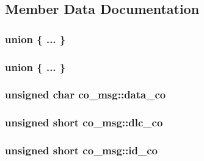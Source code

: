 \subsection{Member Data Documentation}
\subsubsection[{\texorpdfstring{"@2}{@2}}]{\setlength{\rightskip}{0pt plus 5cm}union \{ ... \} }\hypertarget{structco__msg_af8251e2eaf9e807267d3ced55e292142}{}\label{structco__msg_af8251e2eaf9e807267d3ced55e292142}
\subsubsection[{\texorpdfstring{"@4}{@4}}]{\setlength{\rightskip}{0pt plus 5cm}union \{ ... \} }\hypertarget{structco__msg_a549464c55b7bbab6345f082dab73b275}{}\label{structco__msg_a549464c55b7bbab6345f082dab73b275}
\subsubsection[{\texorpdfstring{data\+\_\+co}{data_co}}]{\setlength{\rightskip}{0pt plus 5cm}unsigned char co\+\_\+msg\+::data\+\_\+co}\hypertarget{structco__msg_a3ced1bf4d72ca82fe53c829d42cd946e}{}\label{structco__msg_a3ced1bf4d72ca82fe53c829d42cd946e}
\subsubsection[{\texorpdfstring{dlc\+\_\+co}{dlc_co}}]{\setlength{\rightskip}{0pt plus 5cm}unsigned short co\+\_\+msg\+::dlc\+\_\+co}\hypertarget{structco__msg_ab19d6996baf97d346427d9789d7e4a6b}{}\label{structco__msg_ab19d6996baf97d346427d9789d7e4a6b}
\subsubsection[{\texorpdfstring{id\+\_\+co}{id_co}}]{\setlength{\rightskip}{0pt plus 5cm}unsigned short co\+\_\+msg\+::id\+\_\+co}\hypertarget{structco__msg_a634de83979d7da90565eccdf16304a07}{}\label{structco__msg_a634de83979d7da90565eccdf16304a07}
